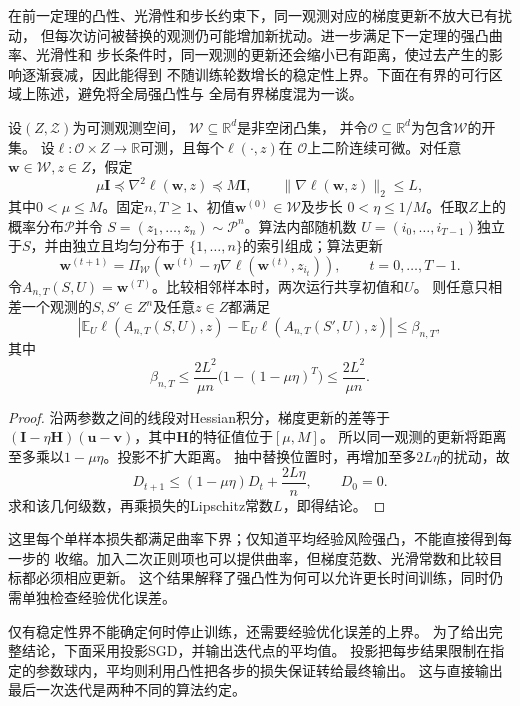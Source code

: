 在前一定理的凸性、光滑性和步长约束下，同一观测对应的梯度更新不放大已有扰动，
但每次访问被替换的观测仍可能增加新扰动。进一步满足下一定理的强凸曲率、光滑性和
步长条件时，同一观测的更新还会缩小已有距离，使过去产生的影响逐渐衰减，因此能得到
不随训练轮数增长的稳定性上界。下面在有界的可行区域上陈述，避免将全局强凸性与
全局有界梯度混为一谈。

\begin{theorem}[强凸投影SGD的稳定性]
\label{thm:strongly-convex-sgd-stability}
设$(Z,\mathcal Z)$为可测观测空间，
$\mathcal W\subseteq\mathbb R^d$是非空闭凸集，
并令$\mathcal O\subseteq\mathbb R^d$为包含$\mathcal W$的开集。
设$\ell:\mathcal O\times Z\to\mathbb R$可测，且每个$\ell(\cdot,z)$在
$\mathcal O$上二阶连续可微。对任意$\bm w\in\mathcal W,z\in Z$，假定
\[
 \mu\bm I\preceq\nabla^2\ell(\bm w,z)\preceq M\bm I,
 \qquad \|\nabla\ell(\bm w,z)\|_2\leq L,
\]
其中$0<\mu\leq M$。固定$n,T\geq1$、初值$\bm w^{(0)}\in\mathcal W$及步长
$0<\eta\leq1/M$。任取$Z$上的概率分布$\mathcal P$并令
$S=(z_1,\ldots,z_n)\sim\mathcal P^n$。算法内部随机数
$U=(i_0,\ldots,i_{T-1})$独立于$S$，并由独立且均匀分布于
$\{1,\ldots,n\}$的索引组成；算法更新
\[
 \bm w^{(t+1)}
 =\Pi_{\mathcal W}\!\left(
 \bm w^{(t)}-\eta\nabla\ell(\bm w^{(t)},z_{i_t})\right),
 \qquad t=0,\ldots,T-1.
\]
令$A_{n,T}(S,U)=\bm w^{(T)}$。比较相邻样本时，两次运行共享初值和$U$。
则任意只相差一个观测的$S,S'\in Z^n$及任意$z\in Z$都满足
\[
 \left|\mathbb E_U\ell(A_{n,T}(S,U),z)
 -\mathbb E_U\ell(A_{n,T}(S',U),z)\right|\leq\beta_{n,T},
\]
其中
\[
 \beta_{n,T}\leq\frac{2L^2}{\mu n}
           \bigl(1-(1-\mu\eta)^T\bigr)
 \leq\frac{2L^2}{\mu n}.
\]
\end{theorem}
\begin{proof}
沿两参数之间的线段对Hessian积分，梯度更新的差等于
$(\bm I-\eta\bm H)(\bm u-\bm v)$，其中$\bm H$的特征值位于$[\mu,M]$。
所以同一观测的更新将距离至多乘以$1-\mu\eta$。投影不扩大距离。
抽中替换位置时，再增加至多$2L\eta$的扰动，故
\[
 D_{t+1}\leq(1-\mu\eta)D_t+\frac{2L\eta}{n},\qquad D_0=0.
\]
求和该几何级数，再乘损失的Lipschitz常数$L$，即得结论。
\end{proof}

这里每个单样本损失都满足曲率下界；仅知道平均经验风险强凸，不能直接得到每一步的
收缩。加入二次正则项也可以提供曲率，但梯度范数、光滑常数和比较目标都必须相应更新。
这个结果解释了强凸性为何可以允许更长时间训练，同时仍需单独检查经验优化误差。

仅有稳定性界不能确定何时停止训练，还需要经验优化误差的上界。
为了给出完整结论，下面采用投影SGD，并输出迭代点的平均值。
投影把每步结果限制在指定的参数球内，平均则利用凸性把各步的损失保证转给最终输出。
这与直接输出最后一次迭代是两种不同的算法约定。

